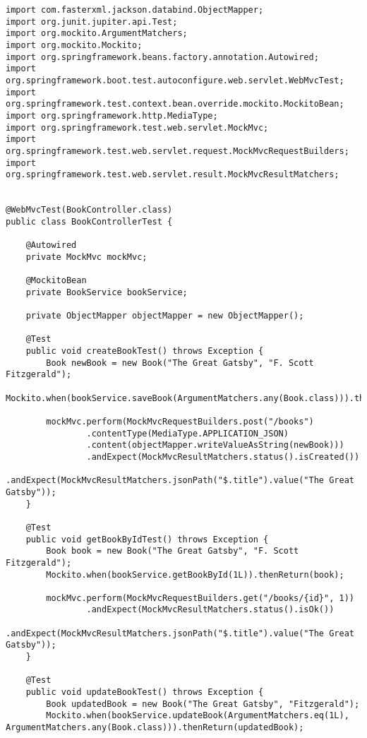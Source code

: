 \begin{lstlisting}
import com.fasterxml.jackson.databind.ObjectMapper;
import org.junit.jupiter.api.Test;
import org.mockito.ArgumentMatchers;
import org.mockito.Mockito;
import org.springframework.beans.factory.annotation.Autowired;
import org.springframework.boot.test.autoconfigure.web.servlet.WebMvcTest;
import org.springframework.test.context.bean.override.mockito.MockitoBean;
import org.springframework.http.MediaType;
import org.springframework.test.web.servlet.MockMvc;
import org.springframework.test.web.servlet.request.MockMvcRequestBuilders;
import org.springframework.test.web.servlet.result.MockMvcResultMatchers;


@WebMvcTest(BookController.class)
public class BookControllerTest {

    @Autowired
    private MockMvc mockMvc;

    @MockitoBean
    private BookService bookService;

    private ObjectMapper objectMapper = new ObjectMapper();

    @Test
    public void createBookTest() throws Exception {
        Book newBook = new Book("The Great Gatsby", "F. Scott Fitzgerald");
        Mockito.when(bookService.saveBook(ArgumentMatchers.any(Book.class))).thenReturn(newBook);

        mockMvc.perform(MockMvcRequestBuilders.post("/books")
                .contentType(MediaType.APPLICATION_JSON)
                .content(objectMapper.writeValueAsString(newBook)))
                .andExpect(MockMvcResultMatchers.status().isCreated())
                .andExpect(MockMvcResultMatchers.jsonPath("$.title").value("The Great Gatsby"));
    }

    @Test
    public void getBookByIdTest() throws Exception {
        Book book = new Book("The Great Gatsby", "F. Scott Fitzgerald");
        Mockito.when(bookService.getBookById(1L)).thenReturn(book);

        mockMvc.perform(MockMvcRequestBuilders.get("/books/{id}", 1))
                .andExpect(MockMvcResultMatchers.status().isOk())
                .andExpect(MockMvcResultMatchers.jsonPath("$.title").value("The Great Gatsby"));
    }

    @Test
    public void updateBookTest() throws Exception {
        Book updatedBook = new Book("The Great Gatsby", "Fitzgerald");
        Mockito.when(bookService.updateBook(ArgumentMatchers.eq(1L), ArgumentMatchers.any(Book.class))).thenReturn(updatedBook);


\end{lstlisting}
